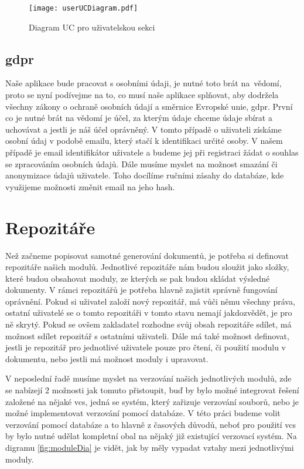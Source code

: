 \begin{figure}[h]
    \centering
    \texttt{[image: userUCDiagram.pdf]}
    \caption{Diagram UC pro uživatelskou sekci}
    \label{fig:userUCDiagram}
\end{figure}

\subsection{\gls{gdpr}}

Naše aplikace bude pracovat s osobními údaji, je nutné toto brát na~vědomí, proto se nyní podívejme na to, co musí naše aplikace splňovat, aby dodržela všechny
zákony o ochraně osobních údají a směrnice Evropské unie, \gls{gdpr}. První co je nutné brát na vědomí je účel, za kterým údaje chceme údaje sbírat a uchovávat a jestli je náš
účel oprávněný. V tomto případě o uživateli získáme osobní údaj v podobě emailu, který stačí k identifikaci určité osoby. V našem případě je email identifikátor uživatele
a budeme jej při registraci žádat o souhlas se zpracováním osobních údajů. Dále musíme myslet na možnost smazání či anonymizace údajů uživatele. Toho docílíme ručními
zásahy do databáze, kde využijeme možnosti změnit email na jeho hash. \cite{gdpr}

\section{Repozitáře}

Než začneme popisovat samotné generování dokumentů, je potřeba si \mbox{definovat} repozitáře našich modulů. Jednotlivé repozitáře nám budou sloužit jako složky,
které budou obsahovat moduly, ze kterých se pak budou skládat výsledné dokumenty. V rámci repozitářů je potřeba hlavně zajistit správně fungování oprávnění.
Pokud si uživatel založí nový repozitář, má vůči němu všechny práva, ostatní uživatelé se o tomto repozitáři v tomto stavu nemají jak\linebreak dozvědět, je pro ně
skrytý. Pokud se ovšem zakladatel rozhodne svůj obsah repozitáře sdílet, má možnost sdílet repozitář s ostatními uživateli.
Dále má také možnost definovat, jestli je repozitář pro jednotlivé uživatele pouze pro čtení, či použití modulu v dokumentu,
nebo jestli má možnost moduly i upravovat.

V neposlední řadě musíme myslet na verzování našich jednotlivých modulů, zde se nabízejí 2 možnosti jak tomuto přistoupit, buď by bylo možné integrovat
řešení založené na nějaké \gls{vcs}, jedná se systém, který zařizuje verzování souborů,
nebo je možné implementovat verzování pomocí databáze. V této práci budeme volit verzování pomocí databáze a to hlavně z časových důvodů, neboť
pro použití \gls{vcs} by bylo nutné udělat kompletní obal na nějaký již existující verzovací systém. Na digramu \ref{fig:moduleDia} je vidět, jak by měly
vypadat vztahy mezi jednotlivými moduly.

